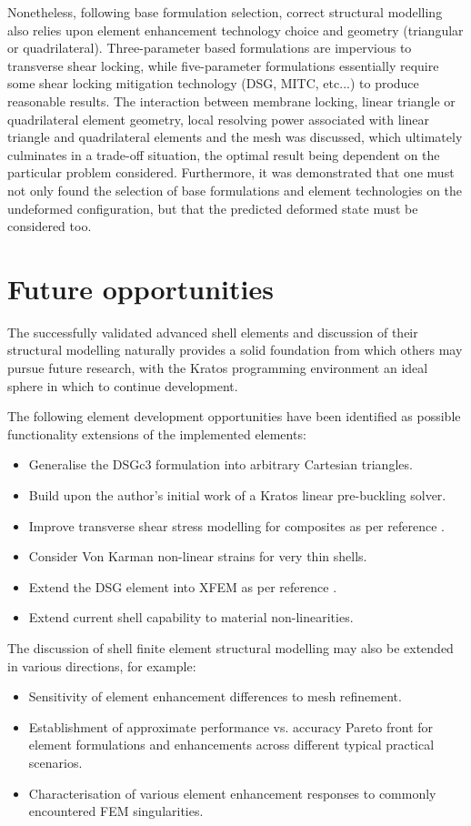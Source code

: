 Nonetheless, following base formulation selection, correct structural modelling also relies upon element enhancement technology choice and geometry (triangular or quadrilateral). Three-parameter  based formulations are impervious to transverse shear locking, while five-parameter formulations essentially require some shear locking mitigation technology (DSG, MITC, etc...) to produce reasonable results. The interaction between membrane locking, linear triangle or quadrilateral element geometry, local resolving power associated with linear triangle and quadrilateral elements and the mesh was discussed, which ultimately culminates in a trade-off situation, the optimal result being dependent on the particular problem considered. Furthermore, it was demonstrated that one must not only found the selection of base formulations and element technologies on the undeformed configuration, but that the predicted deformed state must be considered too. 

\section{Future opportunities}

The successfully validated advanced shell elements and discussion of their structural modelling naturally provides a solid foundation from which others may pursue future research, with the Kratos programming environment an ideal sphere in which to continue development. 

The following element development opportunities have been identified as possible functionality extensions of the implemented elements:
\begin{itemize}
	\item Generalise the DSGc3 formulation into arbitrary Cartesian triangles.
	\item Build upon the author's initial work of a Kratos linear pre-buckling solver.
	\item Improve transverse shear stress modelling for composites as per reference \cite{rolfes1997improved}.
	\item Consider Von Karman non-linear strains for very thin shells.
	\item Extend the DSG element into XFEM as per reference \cite{DSG_XFEM_2015}.
	\item Extend current shell capability to material non-linearities.
\end{itemize}

The discussion of shell finite element structural modelling may also be extended in various directions, for example:
\begin{itemize}
	\item Sensitivity of element enhancement differences to mesh refinement.
	\item Establishment of approximate performance vs. accuracy Pareto front for element formulations and enhancements across different typical practical scenarios.
	\item Characterisation of various element enhancement responses to commonly encountered FEM singularities.
\end{itemize}

